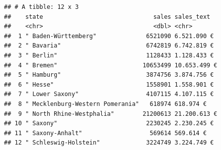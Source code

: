 \documentclass[
]{article}
\begin{document}
\begin{verbatim}
## # A tibble: 12 x 3
##    state                               sales sales_text  
##    <chr>                               <dbl> <chr>       
##  1 " Baden-Württemberg"              6521090 6.521.090 € 
##  2 " Bavaria"                        6742819 6.742.819 € 
##  3 " Berlin"                         1128433 1.128.433 € 
##  4 " Bremen"                        10653499 10.653.499 €
##  5 " Hamburg"                        3874756 3.874.756 € 
##  6 " Hesse"                          1558901 1.558.901 € 
##  7 " Lower Saxony"                   4107115 4.107.115 € 
##  8 " Mecklenburg-Western Pomerania"   618974 618.974 €   
##  9 " North Rhine-Westphalia"        21200613 21.200.613 €
## 10 " Saxony"                         2230245 2.230.245 € 
## 11 " Saxony-Anhalt"                   569614 569.614 €   
## 12 " Schleswig-Holstein"             3224749 3.224.749 €
\end{verbatim}
\end{document}
